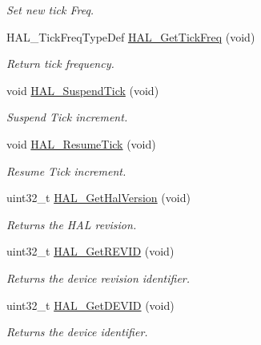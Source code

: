 \begin{DoxyCompactItemize}
\begin{DoxyCompactList}\small\item\em Set new tick Freq. \end{DoxyCompactList}\item 
H\+A\+L\+\_\+\+Tick\+Freq\+Type\+Def \mbox{\hyperlink{group___h_a_l___exported___functions___group2_ga803cdbcc0883bcf5f5c98c50024c97e6}{H\+A\+L\+\_\+\+Get\+Tick\+Freq}} (void)
\begin{DoxyCompactList}\small\item\em Return tick frequency. \end{DoxyCompactList}\item 
void \mbox{\hyperlink{group___h_a_l___exported___functions___group2_ga84ae4b045c45d49d96b2b02e2dc516b6}{H\+A\+L\+\_\+\+Suspend\+Tick}} (void)
\begin{DoxyCompactList}\small\item\em Suspend Tick increment. \end{DoxyCompactList}\item 
void \mbox{\hyperlink{group___h_a_l___exported___functions___group2_gac3fa17aa85e357e3f1af56ad110d2e97}{H\+A\+L\+\_\+\+Resume\+Tick}} (void)
\begin{DoxyCompactList}\small\item\em Resume Tick increment. \end{DoxyCompactList}\item 
uint32\+\_\+t \mbox{\hyperlink{group___h_a_l___exported___functions___group2_gafb139b375512ad2a234e4619b129b966}{H\+A\+L\+\_\+\+Get\+Hal\+Version}} (void)
\begin{DoxyCompactList}\small\item\em Returns the H\+AL revision. \end{DoxyCompactList}\item 
uint32\+\_\+t \mbox{\hyperlink{group___h_a_l___exported___functions___group2_gae051ef9e932404b21f5877c7186406b8}{H\+A\+L\+\_\+\+Get\+R\+E\+V\+ID}} (void)
\begin{DoxyCompactList}\small\item\em Returns the device revision identifier. \end{DoxyCompactList}\item 
uint32\+\_\+t \mbox{\hyperlink{group___h_a_l___exported___functions___group2_gaff785f069ed650de77ff82ac407f7c84}{H\+A\+L\+\_\+\+Get\+D\+E\+V\+ID}} (void)
\begin{DoxyCompactList}\small\item\em Returns the device identifier. \end{DoxyCompactList}\item 

\end{DoxyCompactItemize}
